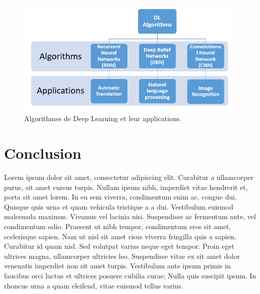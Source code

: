 \begin{figure}[htp]
    \centering
    \includegraphics[width=11cm]{Chapiters/Chapiter_02/Pictures/dl_algo.png}
    \caption{Algorithmes de Deep Learning et leur applications.}
    \label{Deep Learning algorithmes et leur applications}
\end{figure}

\section{Conclusion}
Lorem ipsum dolor sit amet, consectetur adipiscing elit. Curabitur a ullamcorper purus, sit amet cursus turpis. Nullam ipsum nibh, imperdiet vitae hendrerit et, porta sit amet lorem. In eu sem viverra, condimentum enim ac, congue dui. Quisque quis urna et quam vehicula tristique a a dui. Vestibulum euismod malesuada maximus. Vivamus vel lacinia nisi. Suspendisse ac fermentum ante, vel condimentum odio. Praesent ut nibh tempor, condimentum eros sit amet, scelerisque sapien. Nam ut nisl sit amet risus viverra fringilla quis a sapien. Curabitur id quam nisl. Sed volutpat varius neque eget tempor. Proin eget ultrices magna, ullamcorper ultricies leo. Suspendisse vitae ex sit amet dolor venenatis imperdiet non sit amet turpis. Vestibulum ante ipsum primis in faucibus orci luctus et ultrices posuere cubilia curae; Nulla quis suscipit ipsum. In rhoncus urna a quam eleifend, vitae euismod tellus varius.
